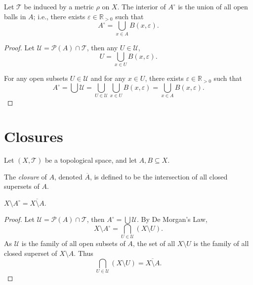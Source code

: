 \begin{proposition}
	Let $\mathcal T$ be induced by a metric $\rho$ on $X$. The interior of $A^\circ$ is the union of all open balls in $A$; i.e., there exists $\varepsilon \in \mathbb R_{>0}$ such that
	$$
	A^\circ = \bigcup_{x \in A} B(x, \varepsilon).
	$$
	
	\begin{proof}
		Let $\mathcal U = \mathcal P(A) \cap \mathcal T$, then any $U \in \mathcal U$,
		$$
		U = \bigcup_{x \in U} B(x, \varepsilon).
		$$
	
		For any open subsets $U \in \mathcal U$ and for any $x \in U$, there exists $\varepsilon \in \mathbb R_{> 0}$ such that
		$$
		A^\circ = \bigcup \mathcal U = \bigcup_{U \in \mathcal U} \bigcup_{x \in U} B(x, \varepsilon) = \bigcup_{x \in A} B(x, \varepsilon).
		$$
	\end{proof}
\end{proposition}


\section{Closures}

Let $(X, \mathcal T)$ be a topological space, and let $A, B \subseteq X$.

\begin{definition}
	The \textit{closure} of $A$, denoted $\overline A$, is defined to be the intersection of all closed supersets of $A$.
\end{definition}


\begin{proposition}
	$X \setminus A^\circ = \overline{X \setminus A}$.
	
	\begin{proof}
		Let $\mathcal U = \mathcal P(A) \cap \mathcal T$, then $A^\circ = \bigcup \mathcal U$. By De Morgan's Law,
		$$
		X \setminus A^\circ = \bigcap_{U \in \mathcal U} (X \setminus U).
		$$
		As $\mathcal U$ is the family of all open subsets of $A$, the set of all $X \setminus U$ is the family of all closed superset of $X \setminus A$. Thus
		$$
		\bigcap_{U \in \mathcal U}(X \setminus U) = \overline{X \setminus A}.
		$$
	\end{proof}
\end{proposition}


